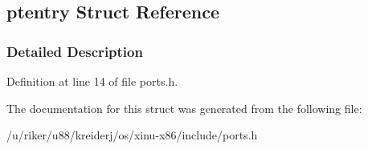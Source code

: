\hypertarget{structptentry}{}\subsection{ptentry Struct Reference}
\label{structptentry}


\subsubsection{Detailed Description}


Definition at line 14 of file ports.\+h.



The documentation for this struct was generated from the following file\+:\begin{DoxyCompactItemize}
\item 
/u/riker/u88/kreiderj/os/xinu-\/x86/include/ports.\+h\end{DoxyCompactItemize}
